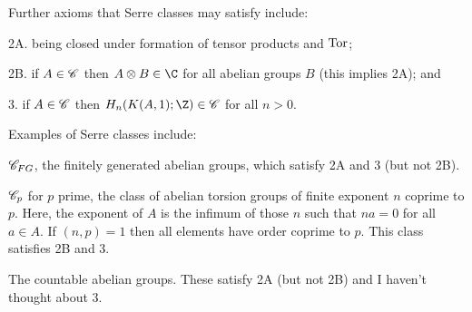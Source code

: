 \documentclass[11pt]{article}
\begin{document}
Further axioms that Serre classes may satisfy include:
\begin{itemise}
\item[2A.] being closed under formation of tensor products and $\operatorname{Tor}$;
\item[2B.] if  $A\in\mathscr{C}$ then $A\otimes B\in\C$ for all abelian groups $B$ (this implies 2A); and
\item[3.] if $A\in\mathscr{C}$ then $H_n(K(A,1);\Z)\in\scrC$ for all $n>0$.
\end{itemise}
Examples of Serre classes include:
\begin{itemise}
\item $\mathscr{C}_{FG}$, the finitely generated abelian groups, which satisfy 2A and 3 (but not 2B).
\item $\mathscr{C}_{p}$ for $p$ prime, the class of abelian torsion groups of finite exponent $n$ coprime to $p$. Here, the exponent of $A$ is the infimum of those $n$ such that $na=0$ for all $a\in A$. If $(n,p)=1$ then all elements have order coprime to $p$. This class satisfies 2B and 3.
\item The countable abelian groups. These satisfy 2A (but not 2B) and I haven't thought about 3.
\end{itemise}
\setcounter{subsection}{1}
\end{document}
